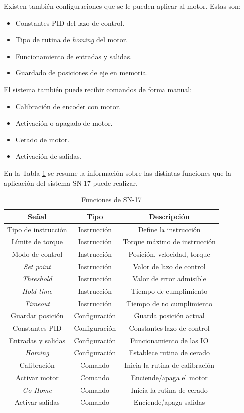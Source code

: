 Existen también configuraciones que se le pueden aplicar al motor. Estas son:
\begin{itemize}
	\item Constantes PID del lazo de control.
	\item Tipo de rutina de \textit{homing} del motor.
	\item Funcionamiento de entradas y salidas.
	\item Guardado de posiciones de eje en memoria.
\end{itemize}

El sistema también puede recibir comandos de forma manual:
\begin{itemize}
	\item Calibración de encoder con motor.
	\item Activación o apagado de motor.
	\item Cerado de motor.
	\item Activación de salidas.
\end{itemize}

En la Tabla \ref{tab:sn17_hoy} se resume la información sobre las distintas funciones que la aplicación del sistema SN-17 puede realizar.

\begin{table}[h]
	\centering
	\caption[Operaciones SN-17]{Funciones de SN-17}
	\begin{tabular}{c c c}    
		\toprule
		\textbf{Señal} 	 & \textbf{Tipo}  & \textbf{Descripción}\\
		\midrule
		Tipo de instrucción & Instrucción 	& Define la instrucción\\		
		Límite de torque 	& Instrucción	& Torque máximo de instrucción \\
		Modo de control		& Instrucción 	& Posición, velocidad, torque \\
		\textit{Set point}	& Instrucción 	& Valor de lazo de control \\
		\textit{Threshold}	& Instrucción 	& Valor de error admisible \\
		\textit{Hold time}	& Instrucción 	& Tiempo de cumplimiento \\
		\textit{Timeout}	& Instrucción 	& Tiempo de no cumplimiento \\
		Guardar posición	& Configuración & Guarda posición actual \\
		Constantes PID		& Configuración & Constantes lazo de control \\	
		Entradas y salidas	& Configuración & Funcionamiento de las IO \\
		\textit{Homing}		& Configuración & Establece rutina de cerado \\	
		Calibración			& Comando		& Inicia la rutina de calibración \\
		Activar motor		& Comando		& Enciende/apaga el motor \\
		\textit{Go Home}	& Comando		& Inicia la rutina de cerado \\
		Activar salidas		& Comando		& Enciende/apaga salidas \\	
		\bottomrule
		\hline
	\end{tabular}
	\label{tab:sn17_hoy}
\end{table}

